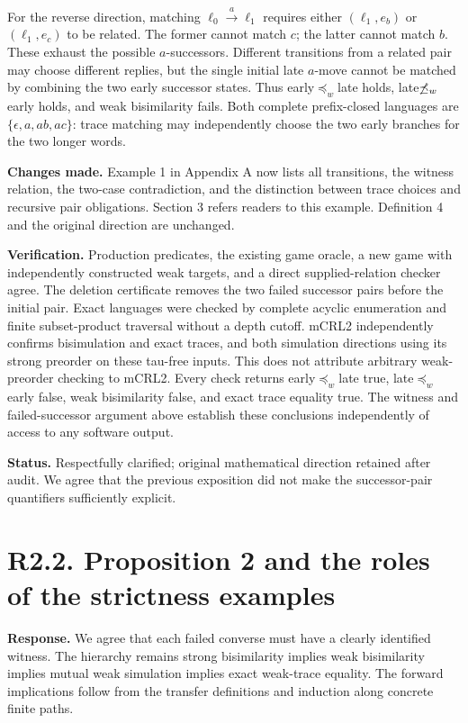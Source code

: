 \documentclass[11pt]{article}
\newcommand{\prew}{\mathrel{\preceq_w}}
\begin{document}
For the reverse direction, matching $\ell_0\xrightarrow{a}\ell_1$ requires
either $(\ell_1,e_b)$ or $(\ell_1,e_c)$ to be related. The former cannot match
$c$; the latter cannot match $b$. These exhaust the possible $a$-successors.
Different transitions from a related pair may choose different replies, but
the single initial late $a$-move cannot be matched by combining the two early
successor states. Thus early$\prew$late holds, late$\not\prew$early holds,
and weak bisimilarity fails. Both complete prefix-closed languages are
$\{\epsilon,a,ab,ac\}$: trace matching may independently choose the two early
branches for the two longer words.

\textbf{Changes made.} Example 1 in Appendix A now lists all transitions, the
witness relation, the two-case contradiction, and the distinction between
trace choices and recursive pair obligations. Section 3 refers readers to this
example. Definition 4 and the original direction are unchanged.

\textbf{Verification.} Production predicates, the existing game oracle, a new
game with independently constructed weak targets, and a direct supplied-relation
checker agree. The deletion certificate removes the two failed successor pairs
before the initial pair. Exact languages were checked by complete acyclic
enumeration and finite subset-product traversal without a depth cutoff.
mCRL2 independently confirms bisimulation and exact traces, and both simulation
directions using its strong preorder on these tau-free inputs. This does not
attribute arbitrary weak-preorder checking to mCRL2.
Every check returns early$\prew$late true, late$\prew$early false,
weak bisimilarity false, and exact trace equality true. The witness and
failed-successor argument above establish these conclusions independently
of access to any software output.

\textbf{Status.} Respectfully clarified; original mathematical direction
retained after audit. We agree that the previous exposition did not make the
successor-pair quantifiers sufficiently explicit.

\section*{R2.2. Proposition 2 and the roles of the strictness examples}
\textbf{Response.} We agree that each failed converse must have a clearly
identified witness. The hierarchy remains strong bisimilarity implies weak
bisimilarity implies mutual weak simulation implies exact weak-trace equality.
The forward implications follow from the transfer definitions and induction
along concrete finite paths.
\end{document}
